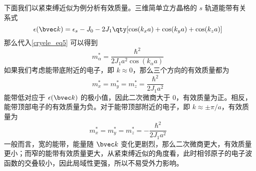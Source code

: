 下面我们以紧束缚近似为例分析有效质量。三维简单立方晶格的 $s$ 轨道能带有关系式
\begin{equation}
\epsilon(\bvec k)=\epsilon_s-J_0-2J_1\qty[\cos(k_xa)+\cos(k_ya)+\cos(k_za)]
\end{equation}
那么代入\autoref{cryele_eq5} 可以得到
\begin{equation}
m_\alpha^*=\frac{\hbar^2}{2 J_1 a^2\cos(k_\alpha a)}
\end{equation}
如果我们考虑能带底附近的电子，即 $k\approx 0$，那么三个方向的有效质量都为
\begin{equation}
m_x^*=m_y^*=m_z^*=\frac{\hbar^2}{2J_1a^2}
\end{equation}
能带低对应于 $\epsilon(\bvec k)$ 的极小值，因此二次微商大于 $0$，有效质量为正。相反，能带顶部电子的有效质量为负。对于能带顶部附近的电子，即 $k\approx \pm \pi/a$，有效质量为
\begin{equation}
m_x^*=m_y^*=m_z^*=-\frac{\hbar^2}{2J_1a^2}
\end{equation}
一般而言，宽的能带，能量随 $\bvec k$ 变化更剧烈，那么二次微商更大，有效质量更小；而窄的能带有效质量更大，从紧束缚近似的角度看，此时相邻原子的电子波函数的交叠较小，因此局域性更强，所以不易受外力影响。

